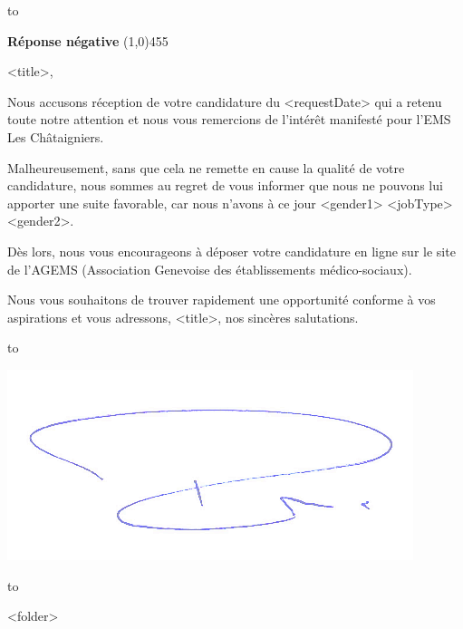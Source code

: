 \documentclass[a4paper, 12pt]{letter}
\begin{document}

\hbox to 

\bigbreak

\begin{flushleft}
	\textbf{Réponse négative}
	\line(1,0){455}
\end{flushleft}
\bigbreak

<title>,

Nous accusons réception de votre candidature du <requestDate> qui a retenu toute notre attention et nous vous remercions de l’intérêt manifesté pour l’EMS Les Châtaigniers.

Malheureusement, sans que cela ne remette en cause la qualité de votre candidature, nous sommes au regret de vous informer que nous ne pouvons lui apporter une suite favorable, car nous n’avons à ce jour <gender1> <jobType> <gender2>.

Dès lors, nous vous encourageons à déposer votre candidature en ligne sur le site de l’AGEMS (Association Genevoise des établissements médico-sociaux).

Nous vous souhaitons de trouver rapidement une opportunité conforme à vos aspirations et vous adressons, <title>, nos sincères salutations.

\bigbreak
\bigbreak
\bigbreak
\bigbreak

\hbox to 

\begin{flushright}
		\includegraphics{sign.png}
		\end{flushright}

\hbox to 

\bigbreak
\bigbreak

<folder>
\end{document}
